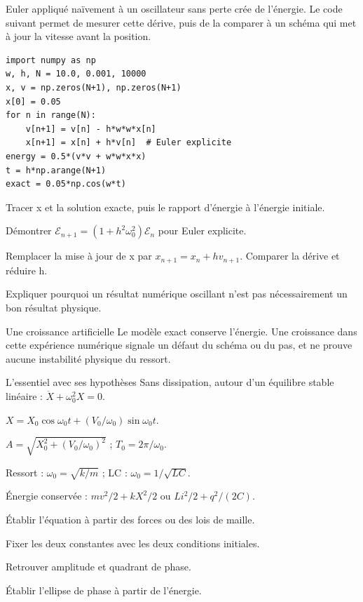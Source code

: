 Euler appliqué naïvement à un oscillateur sans perte crée de l’énergie. Le code suivant permet de mesurer cette dérive, puis de la comparer à un schéma qui met à jour la vitesse avant la position.
\begin{verbatim}
import numpy as np
w, h, N = 10.0, 0.001, 10000
x, v = np.zeros(N+1), np.zeros(N+1)
x[0] = 0.05
for n in range(N):
    v[n+1] = v[n] - h*w*w*x[n]
    x[n+1] = x[n] + h*v[n]  # Euler explicite
energy = 0.5*(v*v + w*w*x*x)
t = h*np.arange(N+1)
exact = 0.05*np.cos(w*t)
\end{verbatim}
\begin{questions}
\item Tracer x et la solution exacte, puis le rapport d’énergie à l’énergie initiale.
\item Démontrer $\mathcal E_{n+1}=(1+h^2\omega_0^2)\mathcal E_n$ pour Euler explicite.
\item Remplacer la mise à jour de x par $x_{n+1}=x_n+h v_{n+1}$. Comparer la dérive et réduire h.
\item Expliquer pourquoi un résultat numérique oscillant n’est pas nécessairement un bon résultat physique.
\end{questions}
\begin{piege}{Une croissance artificielle}
Le modèle exact conserve l’énergie. Une croissance dans cette expérience numérique signale un défaut du schéma ou du pas, et ne prouve aucune instabilité physique du ressort.
\end{piege}


\begin{loi}{L’essentiel avec ses hypothèses}
Sans dissipation, autour d’un équilibre stable linéaire : $\ddot X+\omega_0^2X=0$.\par $X=X_0\cos\omega_0t+(V_0/\omega_0)\sin\omega_0t$.\par $A=\sqrt{X_0^2+(V_0/\omega_0)^2}$ ; $T_0=2\pi/\omega_0$.\par Ressort : $\omega_0=\sqrt{k/m}$ ; LC : $\omega_0=1/\sqrt{LC}$.\par Énergie conservée : $mv^2/2+kX^2/2$ ou $Li^2/2+q^2/(2C)$.
\end{loi}
\begin{questions}
\item Établir l’équation à partir des forces ou des lois de maille.
\item Fixer les deux constantes avec les deux conditions initiales.
\item Retrouver amplitude et quadrant de phase.
\item Établir l’ellipse de phase à partir de l’énergie.
\end{questions}

